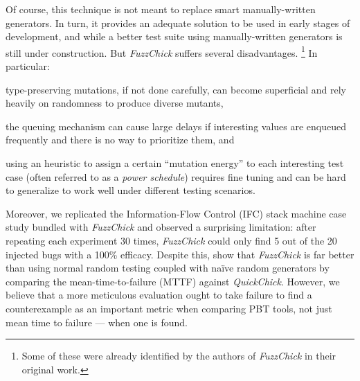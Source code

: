 \documentclass[acmsmall, anonymous]{acmart}
\newcommand{\fuzzchick}{\textit{FuzzChick}\xspace}
\begin{document}
Of course, this technique is not meant to replace smart manually-written
generators.
%
In turn, it provides an adequate solution to be used in early stages of
development, and while a better test suite using manually-written generators is
still under construction.
%
%
%
%
But \fuzzchick suffers several disadvantages.%
\footnote{Some of these were already identified by the authors of \fuzzchick in
  their original work.}
%
In particular:
%
\begin{inparaenum}
\item type-preserving mutations, if not done carefully, can become superficial
  and rely heavily on randomness to produce diverse mutants,
\item the queuing mechanism can cause large delays if interesting values are
  enqueued frequently and there is no way to prioritize them, and
\item using an heuristic to assign a certain ``mutation energy'' to each
  interesting test case (often referred to as a \emph{power schedule}) requires
  fine tuning and can be hard to generalize to work well under different testing
  scenarios.
\end{inparaenum}
%
Moreover, we replicated the Information-Flow Control (IFC) stack machine case
study bundled with \fuzzchick and observed a surprising limitation:
%
after repeating each experiment 30 times, \fuzzchick could only find 5 out of
the 20 injected bugs with a 100\% efficacy.
%
%
Despite this, \citeauthor{lampropoulos2019coverage} show that \fuzzchick is far
better than using normal random testing coupled with na\"ive random generators
by comparing the mean-time-to-failure (MTTF) against \emph{QuickChick}.
%
However, we believe that a more meticulous evaluation ought to take failure to
find a counterexample as an important metric when comparing PBT tools, not just
mean time to failure --- when one is found.
\end{document}
